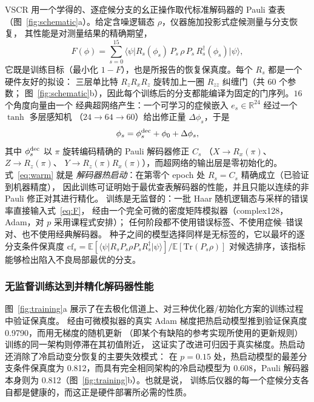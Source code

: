 \documentclass[11pt,a4paper]{article}
\newcommand{\ket}[1]{\lvert #1\rangle}
\newcommand{\bra}[1]{\langle #1\rvert}
\newcommand{\tr}{\mathrm{Tr}}
\begin{document}
VSCR 用一个学得的、逐症候分支的幺正操作取代标准解码器的 Pauli 查表
（图~\ref{fig:schematic}a）。给定含噪逻辑态 $\rho$，仪器施加投影式症候测量与分支恢复，
其性能是对测量结果的精确期望，
\begin{equation}
F(\phi)=\sum_{s=0}^{15}\bra{\psi}R_s(\phi_s)\,P_s\,\rho\,P_s\,
R_s^\dagger(\phi_s)\ket{\psi},
\label{eq:F}
\end{equation}
它既是训练目标（最小化 $1-F$），也是所报告的恢复保真度。每个 $R_s$ 都是一个硬件友好的拟设：
三层单比特 $R_zR_xR_z$ 旋转加上一圈 $R_{zz}$ 纠缠门（共 $60$ 个参数；
图~\ref{fig:schematic}b），因此每个训练后的分支都能编译为固定的门序列。$16$ 个角度向量由一个
经典超网络产生：一个可学习的症候嵌入 $e_s\in\mathbb{R}^{24}$ 经过一个 $\tanh$ 多层感知机
（$24\!\to\!64\!\to\!60$）给出修正量 $\Delta\phi_s$，于是
\begin{equation}
\phi_s=\phi^{\rm dec}_s+\phi_0+\Delta\phi_s,
\label{eq:warm}
\end{equation}
其中 $\phi^{\rm dec}_s$ 以 $\pi$ 旋转编码精确的 Pauli 解码器修正 $C_s$
（$X\!\to\!R_x(\pi)$、$Z\!\to\!R_z(\pi)$、
$Y\!\to\!R_z(\pi)R_x(\pi)$），而超网络的输出层是零初始化的。式~\eqref{eq:warm} 就是
\emph{解码器热启动}：在第零个 epoch 处 $R_s=C_s$ 精确成立（已验证到机器精度），
因此训练可证明始于最优查表解码器的性能，并且只能以连续的非 Pauli 修正对其进行精化。
训练是无监督的：一批 Haar 随机逻辑态与采样的错误率直接输入式~\eqref{eq:F}，
经由一个完全可微的密度矩阵模拟器（complex128，Adam，对 $p$ 采用课程式安排）；
任何阶段都不使用错误标签、不使用症候--错误对、也不使用经典解码器。
种子之间的模型选择同样是无标签的，它以最坏的逐分支条件保真度
$\mathrm{cf}_s=\mathbb{E}[\bra{\psi}R_sP_s\rho P_sR_s^\dagger\ket{\psi}]/
\mathbb{E}[\tr(P_s\rho)]$
对候选排序，该指标能够检出陷入不良局部最优的分支。

\subsubsection*{无监督训练达到并精化解码器性能}

图~\ref{fig:training}a 展示了在去极化信道上、对三种优化器/初始化方案的训练过程中验证保真度。
经由可微模拟器的真实 Adam 梯度把热启动模型推到验证保真度 0.9790，而用无梯度的随机更新
（即某个有缺陷的参考实现所使用的更新规则）训练的同一架构则停滞在其初值附近，
这证实了改进可归因于真实梯度。热启动还消除了冷启动变分恢复的主要失效模式：
在 $p=0.15$ 处，热启动模型的最差分支条件保真度为 0.812，而具有完全相同架构的冷启动模型为
0.608，Pauli 解码器本身则为 0.812（图~\ref{fig:training}b）。也就是说，
训练后仪器的每一个症候分支各自都是健康的，而这正是硬件部署所必需的性质。
\end{document}
